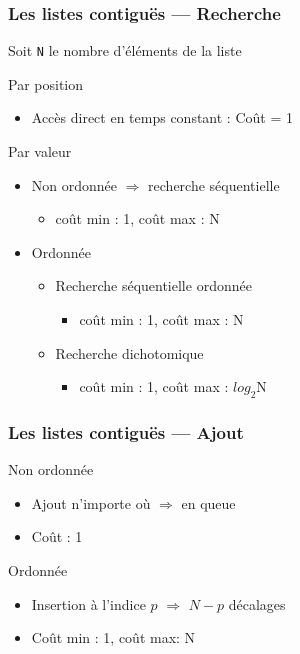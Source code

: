 \documentclass[table,handout,tikz,12pt,svgnames]{beamer}
\begin{document}
\begin{frame}[fragile=singleslide]
	\frametitle{Les listes contiguës --- Recherche}
	\begin{block}{}
        Soit \texttt{N} le nombre d'éléments de la liste
	\end{block}
	\begin{block}{Par position}
		\begin{itemize}
			\item Accès direct en temps constant : Coût = 1
		\end{itemize}
	\end{block}
	\begin{block}{Par valeur}
			\begin{itemize}
				\item Non ordonnée $\Rightarrow$ recherche séquentielle
				\begin{itemize}
					\item coût min : 1, coût max : N
				\end{itemize}
				\item Ordonnée
				\begin{itemize}
					\item Recherche séquentielle ordonnée
					\begin{itemize}
						\item coût min : 1, coût max : N
					\end{itemize}
					\item Recherche dichotomique
					\begin{itemize}
						\item coût min : 1, coût max : $log_2$N
					\end{itemize}
				\end{itemize}
			\end{itemize}
	\end{block}
\end{frame}


\begin{frame}[fragile=singleslide]
	\frametitle{Les listes contiguës --- Ajout}
	\begin{block}{Non ordonnée}
		\begin{itemize}
			\item Ajout n'importe où $\Rightarrow$ en queue
			\item Coût : 1
		\end{itemize}
	\end{block}
	\begin{block}{Ordonnée}
		\begin{itemize}
			\item Insertion à l'indice $p$ $\Rightarrow$ $N-p$ décalages %
			\item Coût min : 1, coût max: N
		\end{itemize}
	\end{block}
\end{frame}
\end{document}
